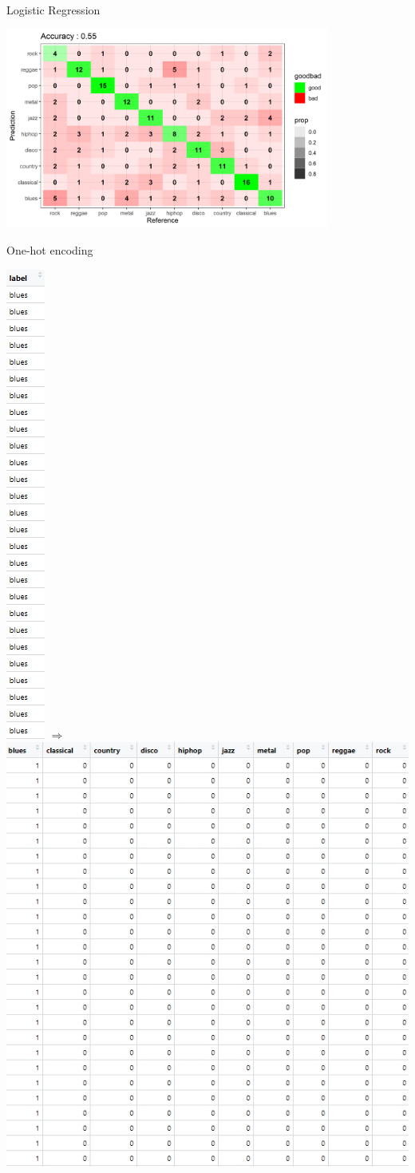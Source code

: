\documentclass[11pt]{beamer}
\begin{document}
\begin{frame}{Logistic Regression}
\begin{center}
    \includegraphics[width=0.8\textwidth]{confusionMatrix_logreg.png}
\end{center}
\end{frame}

\begin{frame}{One-hot encoding}
\begin{itemize}
\end{itemize}
\begin{center}
    \includegraphics[height=0.5\textwidth]{y.jpg}
    $\Longrightarrow$
    \includegraphics[height=0.5\textwidth]{y_matrix.jpg}
\end{center}
\end{frame}
\end{document}
